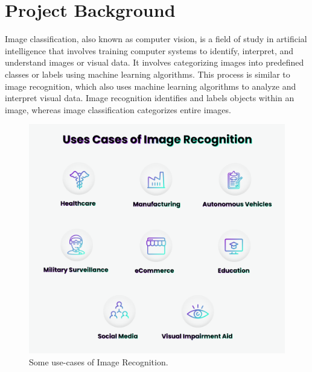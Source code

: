 \documentclass[../main.tex]{subfiles}
\begin{document}
\part*{Project Background}
Image classification, also known as computer vision, is a field of study in artificial intelligence that involves training computer systems to identify, interpret, and understand images or visual data. It involves categorizing images into predefined classes or labels using machine learning algorithms. This process is similar to image recognition, which also uses machine learning algorithms to analyze and interpret visual data. Image recognition identifies and labels objects within an image, whereas image classification categorizes entire images.


\begin{figure}[h!]
\centering
\includegraphics[scale=0.4]{images/image_rec_uses.png}
\caption{Some use-cases of Image Recognition.\citet{im}}
\label{fig:im_uses}
\end{figure}
\end{document}
